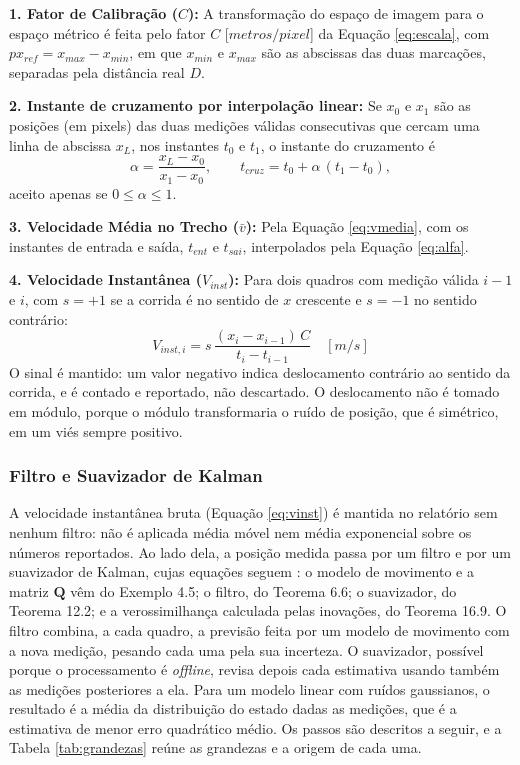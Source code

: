 \documentclass[
    12pt,               %
    openright,          %
    twoside,            %
    a4paper,            %
    chapter=TITLE,      %
    english,            %
    brazil              %
    ]{abntex2}
\begin{document}
\textbf{1. Fator de Calibração ($C$):}
A transformação do espaço de imagem para o espaço métrico é feita pelo fator $C$ [$metros/pixel$] da Equação \ref{eq:escala}, com $px_{ref} = x_{max} - x_{min}$, em que $x_{min}$ e $x_{max}$ são as abscissas das duas marcações, separadas pela distância real $D$.

\textbf{2. Instante de cruzamento por interpolação linear:}
Se $x_0$ e $x_1$ são as posições (em pixels) das duas medições válidas consecutivas que cercam uma linha de abscissa $x_L$, nos instantes $t_0$ e $t_1$, o instante do cruzamento é
\begin{equation} \label{eq:alfa}
    \alpha = \frac{x_L - x_0}{x_1 - x_0}, \qquad t_{cruz} = t_0 + \alpha\,(t_1 - t_0),
\end{equation}
aceito apenas se $0 \le \alpha \le 1$.

\textbf{3. Velocidade Média no Trecho ($\bar{v}$):}
Pela Equação \ref{eq:vmedia}, com os instantes de entrada e saída, $t_{ent}$ e $t_{sai}$, interpolados pela Equação \ref{eq:alfa}.

\textbf{4. Velocidade Instantânea ($V_{inst}$):}
Para dois quadros com medição válida $i-1$ e $i$, com $s = +1$ se a corrida é no sentido de $x$ crescente e $s = -1$ no sentido contrário:
\begin{equation} \label{eq:vinst}
    V_{inst,i} = s\,\frac{(x_i - x_{i-1})\,C}{t_i - t_{i-1}} \quad [m/s]
\end{equation}
O sinal é mantido: um valor negativo indica deslocamento contrário ao sentido da corrida, e é contado e reportado, não descartado. O deslocamento não é tomado em módulo, porque o módulo transformaria o ruído de posição, que é simétrico, em um viés sempre positivo.

\subsubsection{Filtro e Suavizador de Kalman}
\label{sec:kalman}
A velocidade instantânea bruta (Equação \ref{eq:vinst}) é mantida no relatório sem nenhum filtro: não é aplicada média móvel nem média exponencial sobre os números reportados. Ao lado dela, a posição medida passa por um filtro e por um suavizador de Kalman, cujas equações seguem : o modelo de movimento e a matriz $\mathbf{Q}$ vêm do Exemplo 4.5; o filtro, do Teorema 6.6; o suavizador, do Teorema 12.2; e a verossimilhança calculada pelas inovações, do Teorema 16.9. O filtro combina, a cada quadro, a previsão feita por um modelo de movimento com a nova medição, pesando cada uma pela sua incerteza. O suavizador, possível porque o processamento é \textit{offline}, revisa depois cada estimativa usando também as medições posteriores a ela. Para um modelo linear com ruídos gaussianos, o resultado é a média da distribuição do estado dadas as medições, que é a estimativa de menor erro quadrático médio. Os passos são descritos a seguir, e a Tabela \ref{tab:grandezas} reúne as grandezas e a origem de cada uma.
\end{document}
